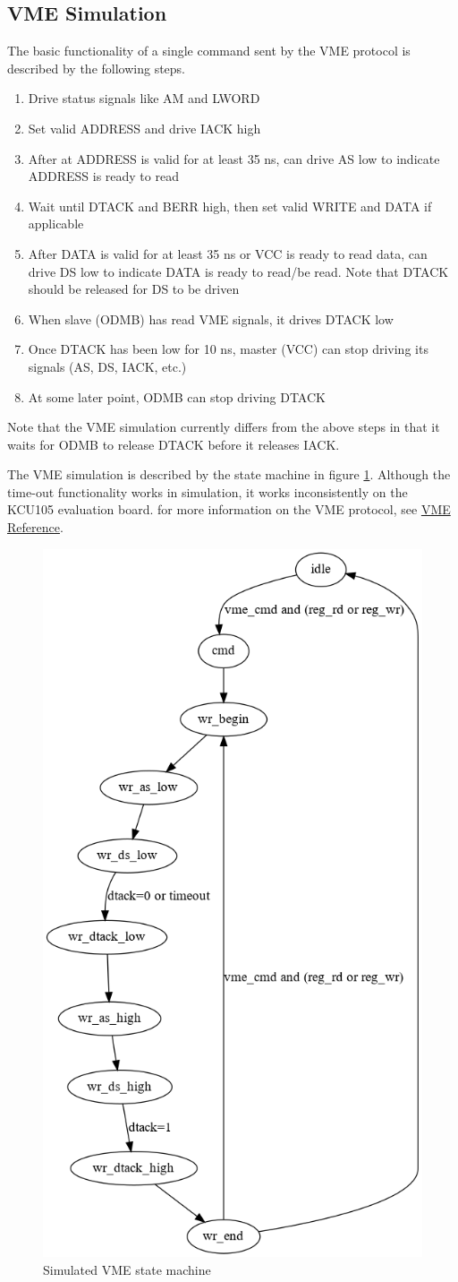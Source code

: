 \documentclass[10pt,a4paper]{article}
\begin{document}
\subsection{VME Simulation}

The basic functionality of a single command sent by the VME protocol is described by the following steps.

\begin{enumerate}
\item Drive status signals like AM and LWORD
\item Set valid ADDRESS and drive IACK high
\item After at ADDRESS is valid for at least 35 ns, can drive AS low to indicate ADDRESS is ready to read
\item Wait until DTACK and BERR high, then set valid WRITE and DATA if applicable
\item After DATA is valid for at least 35 ns or VCC is ready to read data, can drive DS low to indicate DATA is ready to read/be read. Note that DTACK should be released for DS to be driven
\item When slave (ODMB) has read VME signals, it drives DTACK low
\item Once DTACK has been low for 10 ns, master (VCC) can stop driving its signals (AS, DS, IACK, etc.)
\item At some later point, ODMB can stop driving DTACK
\end{enumerate}

Note that the VME simulation currently differs from the above steps in that it waits for ODMB to release DTACK before it releases IACK. 

The VME simulation is described by the state machine in figure \ref{fig:vmestatemachine}. Although the time-out functionality works in simulation, it works inconsistently on the KCU105 evaluation board. for more information on the VME protocol, see \href{http://www.interfacebus.com/Design_Connector_VME.html}{VME Reference}.

\begin{figure}[H]
\centering
\includegraphics[width= 0.4 \textwidth]{figures/vmestates.png}
\caption{Simulated VME state machine}
\label{fig:vmestatemachine}
\end{figure}
\end{document}
